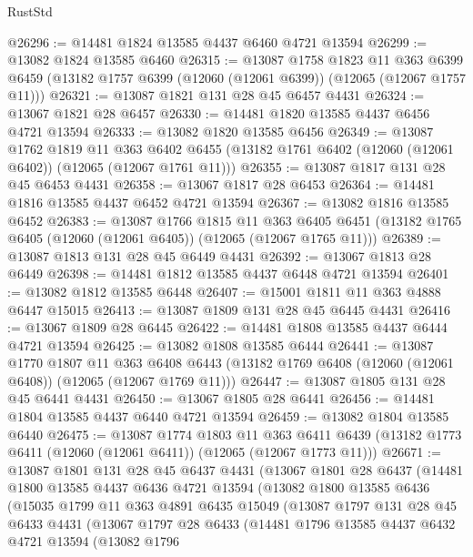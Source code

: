 \begin{lexlean}{RustStd}
\begin{coremodule}
@26296 := @14481 @1824 @13585 @4437 @6460 @4721 @13594
@26299 := @13082 @1824 @13585 @6460
@26315 := @13087
    @1758
    @1823
    @11
    @363
    @6399
    @6459
    (@13182 @1757 @6399 (@12060 (@12061 @6399)) (@12065 (@12067 @1757 @11)))
@26321 := @13087 @1821 @131 @28 @45 @6457 @4431
@26324 := @13067 @1821 @28 @6457
@26330 := @14481 @1820 @13585 @4437 @6456 @4721 @13594
@26333 := @13082 @1820 @13585 @6456
@26349 := @13087
    @1762
    @1819
    @11
    @363
    @6402
    @6455
    (@13182 @1761 @6402 (@12060 (@12061 @6402)) (@12065 (@12067 @1761 @11)))
@26355 := @13087 @1817 @131 @28 @45 @6453 @4431
@26358 := @13067 @1817 @28 @6453
@26364 := @14481 @1816 @13585 @4437 @6452 @4721 @13594
@26367 := @13082 @1816 @13585 @6452
@26383 := @13087
    @1766
    @1815
    @11
    @363
    @6405
    @6451
    (@13182 @1765 @6405 (@12060 (@12061 @6405)) (@12065 (@12067 @1765 @11)))
@26389 := @13087 @1813 @131 @28 @45 @6449 @4431
@26392 := @13067 @1813 @28 @6449
@26398 := @14481 @1812 @13585 @4437 @6448 @4721 @13594
@26401 := @13082 @1812 @13585 @6448
@26407 := @15001 @1811 @11 @363 @4888 @6447 @15015
@26413 := @13087 @1809 @131 @28 @45 @6445 @4431
@26416 := @13067 @1809 @28 @6445
@26422 := @14481 @1808 @13585 @4437 @6444 @4721 @13594
@26425 := @13082 @1808 @13585 @6444
@26441 := @13087
    @1770
    @1807
    @11
    @363
    @6408
    @6443
    (@13182 @1769 @6408 (@12060 (@12061 @6408)) (@12065 (@12067 @1769 @11)))
@26447 := @13087 @1805 @131 @28 @45 @6441 @4431
@26450 := @13067 @1805 @28 @6441
@26456 := @14481 @1804 @13585 @4437 @6440 @4721 @13594
@26459 := @13082 @1804 @13585 @6440
@26475 := @13087
    @1774
    @1803
    @11
    @363
    @6411
    @6439
    (@13182 @1773 @6411 (@12060 (@12061 @6411)) (@12065 (@12067 @1773 @11)))
@26671 := @13087
    @1801
    @131
    @28
    @45
    @6437
    @4431
    (@13067
      @1801
      @28
      @6437
      (@14481
        @1800
        @13585
        @4437
        @6436
        @4721
        @13594
        (@13082
          @1800
          @13585
          @6436
          (@15035
            @1799
            @11
            @363
            @4891
            @6435
            @15049
            (@13087
              @1797
              @131
              @28
              @45
              @6433
              @4431
              (@13067
                @1797
                @28
                @6433
                (@14481
                  @1796
                  @13585
                  @4437
                  @6432
                  @4721
                  @13594
                  (@13082
                    @1796

\end{coremodule}
\end{lexlean}
